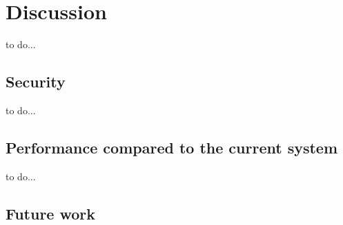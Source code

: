 \section{Discussion}
\label{S:6}

\begin{answer}
    to do... \\
\end{answer}

\subsection{Security}

\begin{answer}
    to do... \\
\end{answer}

\subsection{Performance compared to the current system}

\begin{answer}
    to do... \\
\end{answer}

\subsection{Future work}
